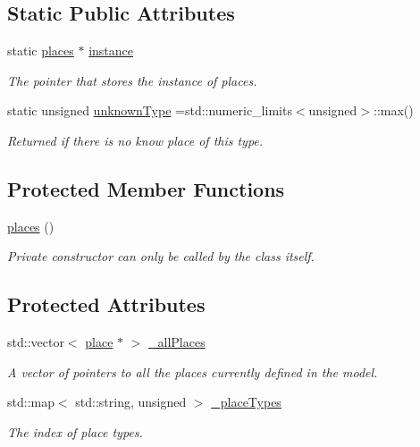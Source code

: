 \subsection*{Static Public Attributes}
\begin{DoxyCompactItemize}
\item 
\mbox{\label{classplaces_acac17c038967becf0ccaffbcc88e35fa}} 
static \mbox{\hyperlink{classplaces}{places}} $\ast$ \mbox{\hyperlink{classplaces_acac17c038967becf0ccaffbcc88e35fa}{instance}}
\begin{DoxyCompactList}\small\item\em The pointer that stores the instance of places. \end{DoxyCompactList}\item 
static unsigned \mbox{\hyperlink{classplaces_ab03feda32ddd4784c17de8b2185b3563}{unknown\+Type}} =std\+::numeric\+\_\+limits$<$unsigned$>$\+::max()
\begin{DoxyCompactList}\small\item\em Returned if there is no know place of this type. \end{DoxyCompactList}\end{DoxyCompactItemize}
\subsection*{Protected Member Functions}
\begin{DoxyCompactItemize}
\item 
\mbox{\hyperlink{classplaces_a1c4116c838392a6d35169126334f3f61}{places}} ()
\begin{DoxyCompactList}\small\item\em Private constructor can only be called by the class itself. \end{DoxyCompactList}\end{DoxyCompactItemize}
\subsection*{Protected Attributes}
\begin{DoxyCompactItemize}
\item 
std\+::vector$<$ \mbox{\hyperlink{classplace}{place}} $\ast$ $>$ \mbox{\hyperlink{classplaces_a2cb6b12513a2245fd06b567490229d89}{\+\_\+all\+Places}}
\begin{DoxyCompactList}\small\item\em A vector of pointers to all the places currently defined in the model. \end{DoxyCompactList}\item 
std\+::map$<$ std\+::string, unsigned $>$ \mbox{\hyperlink{classplaces_a7d5529185ae4635d2e2048b4ae475c12}{\+\_\+place\+Types}}
\begin{DoxyCompactList}\small\item\em The index of place types. \end{DoxyCompactList}\end{DoxyCompactItemize}


